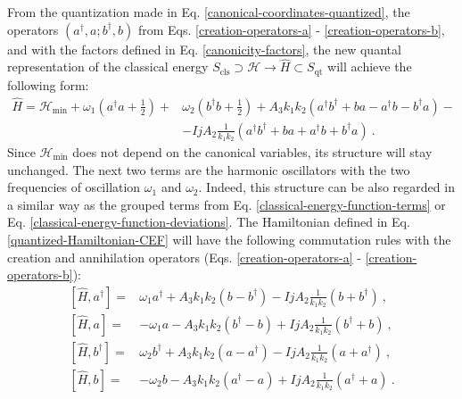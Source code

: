 From the quantization made in Eq. \ref{canonical-coordinates-quantized}, the operators $(a^\dagger,a;b^\dagger,b)$ from Eqs. \ref{creation-operators-a} - \ref{creation-operators-b}, and with the factors defined in Eq. \ref{canonicity-factors}, the new quantal representation of the classical energy $S_\text{cls}\supset\mathcal{H}\to\hat{H}\subset S_\text{qt}$ will achieve the following form:
\begin{align}
    \hat{H}=\mathcal{H}_\text{min}+\omega_1\left(a^\dagger a+\frac{1}{2}\right)+&\omega_2\left(b^\dagger b+\frac{1}{2}\right)+A_3k_1k_2\left(a^\dagger b^\dagger+ba-a^\dagger b-b^\dagger a\right)-\nonumber\\
                                   &-IjA_2\frac{1}{k_1k_2}\left(a^\dagger b^\dagger + ba + a^\dagger b + b^\dagger a \right)\ .
    \label{quantized-Hamiltonian-CEF}
\end{align}
Since $\mathcal{H}_\text{min}$ does not depend on the canonical variables, its structure will stay unchanged. The next two terms are the harmonic oscillators with the two frequencies of oscillation $\omega_1$ and $\omega_2$. Indeed, this structure can be also regarded in a similar way as the grouped terms from Eq. \ref{classical-energy-function-terms} or Eq. \ref{classical-energy-function-deviations}. The Hamiltonian defined in Eq. \ref{quantized-Hamiltonian-CEF} will have the following commutation rules with the creation and annihilation operators (Eqs. \ref{creation-operators-a} - \ref{creation-operators-b}):
\begin{align}
    \left[\hat{H},a^\dagger\right]=&\omega_1a^\dagger+A_3k_1k_2(b-b^\dagger)-IjA_2\frac{1}{k_1k_2}(b+b^\dagger)\ ,\nonumber\\
    \left[\hat{H},a\right]=&-\omega_1a-A_3k_1k_2(b^\dagger-b)+IjA_2\frac{1}{k_1k_2}(b^\dagger+b)\ ,\nonumber\\
    \left[\hat{H},b^\dagger\right]=&\omega_2b^\dagger+A_3k_1k_2\left(a-a^\dagger\right)-IjA_2\frac{1}{k_1k_2}\left(a+a^\dagger\right)\ ,\nonumber\\
    \left[\hat{H},b\right]=&-\omega_2b-A_3k_1k_2\left(a^\dagger-a\right)+IjA_2\frac{1}{k_1k_2}\left(a^\dagger+a\right)\ .
    \label{H-quantal-linear-system-a-b-operators}
\end{align}

